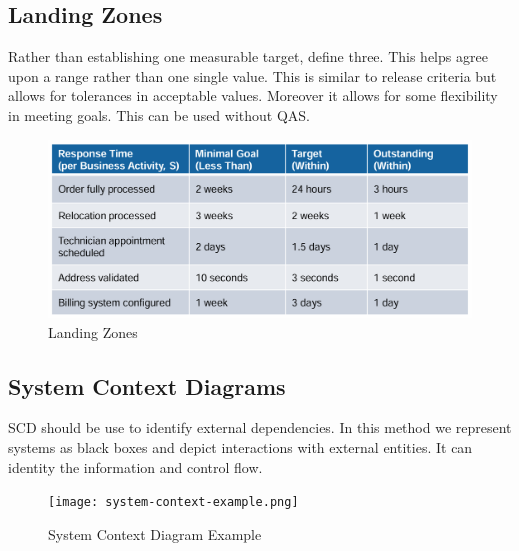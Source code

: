 \documentclass[../Main.tex]{subfiles}
\begin{document}
\subsection{Landing Zones}
Rather than establishing one measurable target, define three.
This helps agree upon a range rather than one single value.
This is similar to release criteria but allows for tolerances
in acceptable values. Moreover it allows for some flexibility
in meeting goals. This can be used without QAS.

\begin{figure}[H]
    \centering
    \includegraphics[width=1\linewidth]{Images/landingzone.png}
    \caption{Landing Zones}
\end{figure}

\subsection{System Context Diagrams}
SCD should be use to identify external dependencies.
In this method we represent systems as black boxes and
depict interactions with external entities.
It can identity the information and control flow.

\begin{figure}[H]
    \centering
    \texttt{[image: system-context-example.png]}
    \caption{System Context Diagram Example}
\end{figure}

\end{document}
